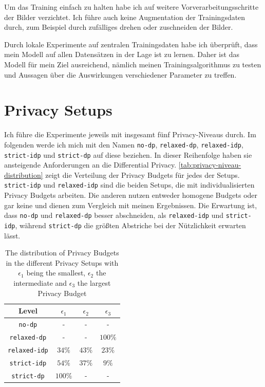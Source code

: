 Um das Training einfach zu halten habe ich auf weitere Vorverarbeitungsschritte der Bilder verzichtet. Ich führe auch keine Augmentation der Trainingsdaten durch, zum Beispiel durch zufälliges drehen oder zuschneiden der Bilder.

Durch lokale Experimente auf zentralen Trainingsdaten habe ich überprüft, dass mein Modell auf allen Datensätzen in der Lage ist zu lernen. Daher ist das Modell für mein Ziel ausreichend, nämlich meinen Trainingsalgorithmus zu testen und Aussagen über die Auswirkungen verschiedener Parameter zu treffen.

\section{Privacy Setups}
Ich führe die Experimente jeweils mit insgesamt fünf Privacy-Niveaus durch. Im folgenden werde ich mich mit den Namen \texttt{no-dp}, \texttt{relaxed-dp}, \texttt{relaxed-idp}, \texttt{strict-idp} und \texttt{strict-dp} auf diese beziehen. In dieser Reihenfolge haben sie ansteigende Anforderungen an die Differential Privacy. \autoref{tab:privacy-niveau-distribution} zeigt die Verteilung der Privacy Budgets für jedes der Setups. \texttt{strict-idp} und \texttt{relaxed-idp} sind die beiden Setups, die mit individualisierten Privacy Budgets arbeiten. Die anderen nutzen entweder homogene Budgets oder gar keine und dienen zum Vergleich mit meinen Ergebnissen. Die Erwartung ist, dass \texttt{no-dp} und \texttt{relaxed-dp} besser abschneiden, als \texttt{relaxed-idp} und \texttt{strict-idp}, während \texttt{strict-dp} die größten Abstriche bei der Nützlichkeit erwarten lässt.

\begin{table}[tb]
	\centering
	\begin{tabular}{|c|c|c|c|}
		\hline
		Level & $\epsilon_1$ & $\epsilon_2$ & $\epsilon_3$ \\
		\hline
		\texttt{no-dp} & - & - & - \\
		\texttt{relaxed-dp} & - & - & $100\%$ \\
		\texttt{relaxed-idp} & $34\%$ & $43\%$ & $23\%$ \\
		\texttt{strict-idp} & $54\%$ & $37\%$ & $9\%$ \\
		\texttt{strict-dp} & $100\%$ & - & - \\
		\hline
	\end{tabular}
	\caption{The distribution of Privacy Budgets in the different Privacy Setups with $\epsilon_1$ being the smallest, $\epsilon_2$ the intermediate and $\epsilon_3$ the largest Privacy Budget}
	\label{tab:privacy-niveau-distribution}
\end{table}

